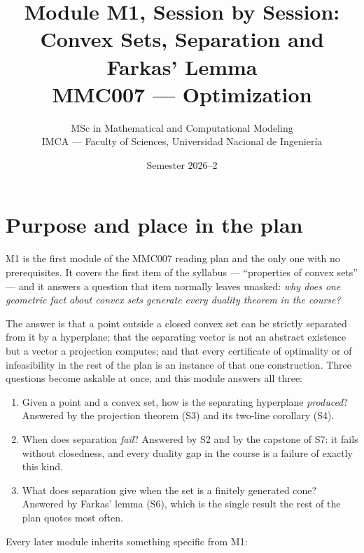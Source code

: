 \documentclass[11pt,a4paper]{article}
\title{\textbf{Module M1, Session by Session:\\ Convex Sets, Separation and Farkas' Lemma}\\[3pt]
\large MMC007 --- Optimization}
\author{MSc in Mathematical and Computational Modeling\\
IMCA --- Faculty of Sciences, Universidad Nacional de Ingenier\'ia}
\date{Semester 2026--2}
\theoremstyle{definition}
\theoremstyle{plain}
\theoremstyle{remark}
\begin{document}
\maketitle

\section{Purpose and place in the plan}

M1 is the first module of the MMC007 reading plan and the only one with no prerequisites. It
covers the first item of the syllabus --- ``properties of convex sets'' --- and it answers a
question that item normally leaves unasked: \emph{why does one geometric fact about convex sets
generate every duality theorem in the course?}

The answer is that a point outside a closed convex set can be strictly separated from it by a
hyperplane; that the separating vector is not an abstract existence but a vector a projection
computes; and that every certificate of optimality or of infeasibility in the rest of the plan
is an instance of that one construction. Three questions become askable at once, and this
module answers all three:

\begin{enumerate}
\item Given a point and a convex set, how is the separating hyperplane \emph{produced}?
Answered by the projection theorem (S3) and its two-line corollary (S4).
\item When does separation \emph{fail}? Answered by S2 and by the capstone of S7: it fails
without closedness, and every duality gap in the course is a failure of exactly this kind.
\item What does separation give when the set is a finitely generated cone? Answered by Farkas'
lemma (S6), which is the single result the rest of the plan quotes most often.
\end{enumerate}

Every later module inherits something specific from M1:
\end{document}
